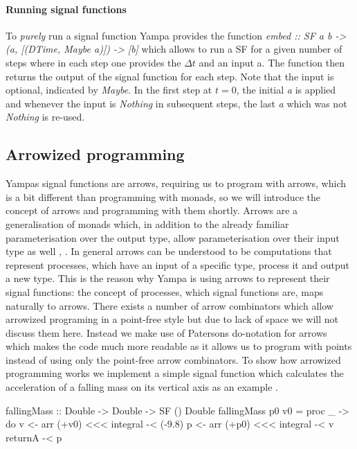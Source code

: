 \paragraph{Running signal functions}
To \textit{purely} run a signal function Yampa provides the function \textit{embed :: SF a b -> (a, [(DTime, Maybe a)]) -> [b]} which allows to run a SF for a given number of steps where in each step one provides the $\Delta t$ and an input a. The function then returns the output of the signal function for each step. Note that the input is optional, indicated by \textit{Maybe}. In the first step at $t = 0$, the initial \textit{a} is applied and whenever the input is \textit{Nothing} in subsequent steps, the last \textit{a} which was not \textit{Nothing} is re-used.

\subsection{Arrowized programming}
Yampas signal functions are arrows, requiring us to program with arrows, which is a bit different than programming with monads, so we will introduce the concept of arrows and programming with them shortly. Arrows are a generalisation of monads which, in addition to the already familiar parameterisation over the output type, allow parameterisation over their input type as well \cite{hughes_generalising_2000}, \cite{hughes_programming_2005}. In general arrows can be understood to be computations that represent processes, which have an input of a specific type, process it and output a new type. This is the reason why Yampa is using arrows to represent their signal functions: the concept of processes, which signal functions are, maps naturally to arrows. There exists a number of arrow combinators which allow arrowized programing in a point-free style but due to lack of space we will not discuss them here. Instead we make use of Patersons do-notation for arrows \cite{paterson_new_2001} which makes the code much more readable as it allows us to program with points instead of using only the point-free arrow combinators. To show how arrowized programming works we implement a simple signal function which calculates the acceleration of a falling mass on its vertical axis as an example \cite{perez_testing_2017}.

\begin{HaskellCode}
fallingMass :: Double -> Double -> SF () Double
fallingMass p0 v0 = proc _ -> do
  v <- arr (+v0) <<< integral -< (-9.8)
  p <- arr (+p0) <<< integral -< v
  returnA -< p
\end{HaskellCode}

